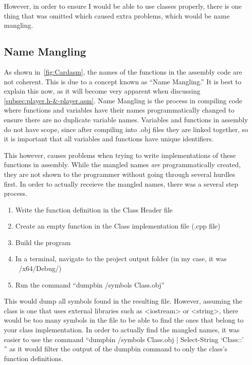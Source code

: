 \documentclass[twoside]{article}
\begin{document}
    \noindent
    However, in order to ensure I would be able to use classes properly, there is one thing that was omitted which caused extra problems, which would be name mangling.

    \subsection{Name Mangling}\label{subsec:name-mangling}
    As shown in~\ref{fig:Cardasm}, the names of the functions in the assembly code are not coherent.
    This is due to a concept known as ``Name Mangling.''
    It is best to explain this now, as it will become very apparent when discussing \ref{subsec:player.h-&-player.asm}.
    Name Mangling is the process in compiling code where functions and variables have their names programmatically changed to ensure there are no duplicate variable names.
    Variables and functions in assembly do not have scope, since after compiling into .obj files they are linked together, so it is important that all variables and functions have unique identifiers.

    \bigbreak
    \noindent
    This however, causes problems when trying to write implementations of these functions in assembly.
    While the mangled names \emph{are} programmatically created, they are not shown to the programmer without going through several hurdles first.
    In order to actually receieve the mangled names, there was a several step process.
    \begin{enumerate}
        \item Write the function definition in the Class Header file
        \item Create an empty function in the Class implementation file (.cpp file)
        \item Build the program
        \item In a terminal, navigate to the project output folder (in my case, it was ~/x64/Debug/)
        \item Run the command ``dumpbin /symbols Class.obj''
    \end{enumerate}
    This would dump all symbols found in the resulting file.
    However, assuming the class is one that uses external libraries such as <iostream> or <string>, there would be too many symbols in the file to be able to find the ones that belong to your class implementation.
    In order to actually find the mangled names, it was easier to use the command ``dumpbin /symbols Class.obj | Select-String `Class::' '' as it would filter the output of the dumpbin command to only the class's function definitions.
\end{document}
